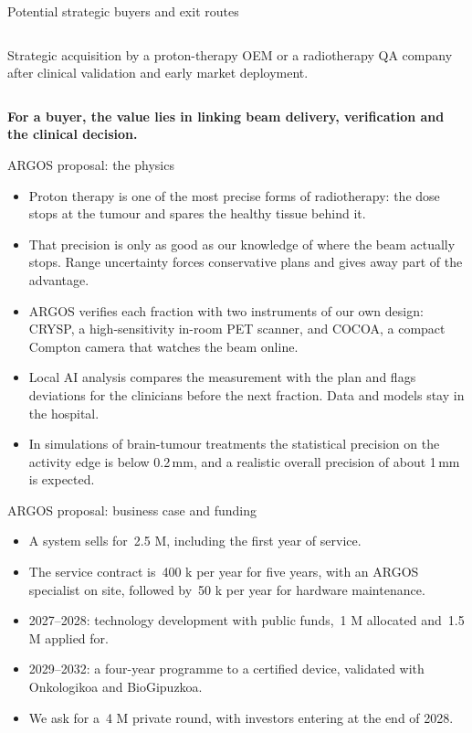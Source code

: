 \documentclass[aspectratio=169,11pt]{beamer}
\newcommand{\hi}[1]{\textcolor{crRed}{#1}}
\begin{document}
\begin{frame}{Potential strategic buyers and exit routes}
\begin{columns}[T,onlytextwidth]
Strategic acquisition by a proton-therapy OEM or a radiotherapy
QA company after clinical validation and early market deployment.

\end{columns}

\vspace{0.30cm}

\begin{center}
\small\bfseries\color{darkred}
For a buyer, the value lies in linking beam delivery, verification and the clinical decision.
\end{center}

\end{frame}

\begin{frame}{ARGOS proposal: the physics}
\small
\begin{itemize}
\setlength{\itemsep}{0.18cm}
\item Proton therapy is one of the most precise forms of radiotherapy: the dose stops at the tumour and spares the healthy tissue behind it.
\item That precision is only as good as our knowledge of where the beam actually stops. Range uncertainty forces conservative plans and gives away part of the advantage.
\item ARGOS verifies each fraction with two instruments of our own design: \hi{CRYSP}, a high-sensitivity in-room PET scanner, and \hi{COCOA}, a compact Compton camera that watches the beam online.
\item Local AI analysis compares the measurement with the plan and flags deviations for the clinicians before the next fraction. Data and models stay in the hospital.
\item In simulations of brain-tumour treatments the statistical precision on the activity edge is below 0.2\,mm, and a realistic overall precision of about \hi{1\,mm} is expected.
\end{itemize}
\end{frame}

\begin{frame}{ARGOS proposal: business case and funding}
\small
\begin{itemize}
\setlength{\itemsep}{0.18cm}
\item A system sells for \hi{\EUR\,2.5 M}, including the first year of service.
\item The service contract is \hi{\EUR\,400 k per year for five years}, with an ARGOS specialist on site, followed by \EUR\,50 k per year for hardware maintenance.
\item 2027--2028: technology development with public funds, \EUR\,1 M allocated and \EUR\,1.5 M applied for.
\item 2029--2032: a four-year programme to a certified device, validated with Onkologikoa and BioGipuzkoa.
\item We ask for a \hi{\EUR\,4 M private round}, with investors entering at the end of 2028.
\end{itemize}
\end{frame}
\end{document}
